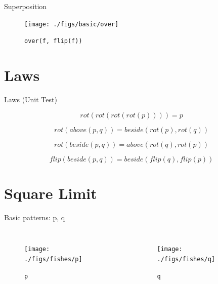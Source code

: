 \documentclass{beamer}
\begin{document}
    \begin{frame}{Superposition}
        \begin{figure}
            \centering
            \texttt{[image: ./figs/basic/over]}
            \caption{\texttt{over(f, flip(f))}}
            \label{fig:over_f}
        \end{figure}
    \end{frame}

    \section{Laws}

    \begin{frame}{Laws (Unit Test)}

        \begin{equation*}
        rot(rot(rot(rot(p)))) = p
        \end{equation*}

        \begin{equation*}
        rot(above(p, q)) = beside(rot(p), rot(q))
        \end{equation*}

        \begin{equation*}
        rot(beside(p, q)) = above(rot(q), rot(p))
        \end{equation*}

        \begin{equation*}
        flip(beside(p, q)) = beside(flip(q), flip(p))
        \end{equation*}
    \end{frame}

    \section{Square Limit}

    \begin{frame}{Basic patterns: p, q}

        \begin{columns}[T,onlytextwidth]
                \begin{figure}
                    \centering
                    \texttt{[image: ./figs/fishes/p]}
                    \caption{\texttt{p}}
                    \label{fig:p}
                \end{figure}

                \begin{figure}
                    \centering
                    \texttt{[image: ./figs/fishes/q]}
                    \caption{\texttt{q}}
                    \label{fig:q}
                \end{figure}

        \end{columns}

    \end{frame}
\end{document}
